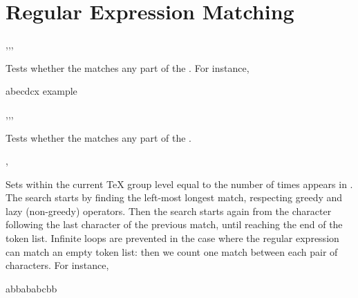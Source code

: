 \documentclass[oneside]{book}
\begin{document}
\section{Regular Expression Matching}

\begin{function}{\regexMatch,\regexMatchT,\regexMatchF,\regexMatchTF}
\begin{syntax}
  
   
   
    
\end{syntax}
Tests whether the  matches any part
of the . For instance,
\begin{demohigh}
 {abecdcx} {} {}
\regexMatchTF {[b-dq-w]} {example} {} {}
\end{demohigh}
\end{function}

\begin{function}{\regexVarMatch,\regexVarMatchT,\regexVarMatchF,\regexVarMatchTF}
\begin{syntax}
  
   
   
    
\end{syntax}
Tests whether the  matches any part of the .
\end{function}

\begin{function}{\regexCount,\regexVarCount}
\begin{syntax}
   
   
\end{syntax}
Sets  within the current \TeX{} group level
equal to the number of times
 appears in .
The search starts by finding the left-most longest match,
respecting greedy and lazy (non-greedy) operators. Then the search
starts again from the character following the last character
of the previous match, until reaching the end of the token list.
Infinite loops are prevented in the case where the regular expression
can match an empty token list: then we count one match between each
pair of characters. For instance,
\begin{demohigh}
\intNew \lFooInt
{} {abbababcbb} \lFooInt
\intUse \lFooInt
\end{demohigh}
\end{function}
\end{document}

